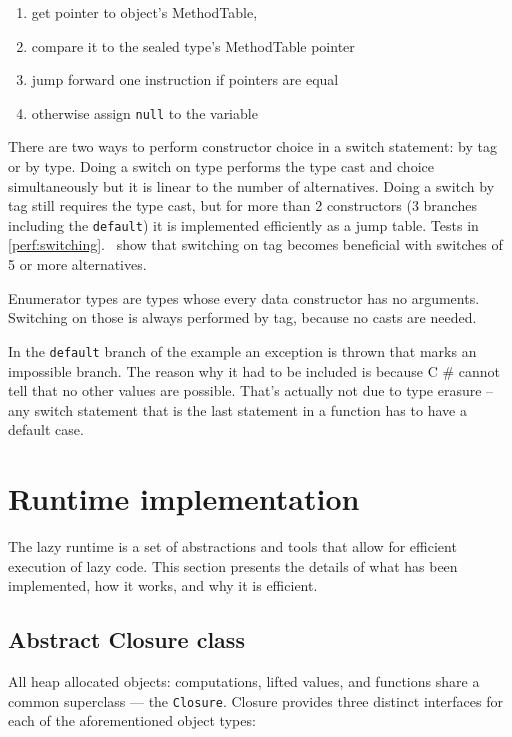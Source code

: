 \documentclass[en]{pracamgr}
\newcommand{\shrp}{%
  {\fontfamily{ppl}\selectfont\#%
  }}
\newcommand{\myref}[1]{\ref{#1}.~\textit{\nameref{#1}}}
\begin{document}
\begin{enumerate}
    \item get pointer to object's MethodTable,
    \item compare it to the sealed type's MethodTable pointer
    \item jump forward one instruction if pointers are equal
    \item otherwise assign \texttt{null} to the variable 
\end{enumerate}

There are two ways to perform constructor choice in a switch statement:
by tag or by type. Doing a switch on type performs the type
cast and choice simultaneously but it is linear to the
number of alternatives. Doing a switch by tag still
requires the type cast, but for more than 2 constructors (3
branches including the \texttt{default}) it is implemented efficiently as a jump table.
Tests in \myref{perf:switching} show that switching on tag
becomes beneficial with switches of 5 or more alternatives.

Enumerator types are types whose every data constructor has no arguments.
Switching on those is always performed by tag, because no casts are needed.

In the \texttt{default} branch of the example an exception is thrown that marks
an impossible branch.
The reason why it had to be included is because C\shrp{}
cannot tell that no other values are possible.
That's actually not due to type erasure -- any switch statement that
is the last statement in a function has to have a default case.

\section{Runtime implementation}\label{s:runtime_impl}

The lazy runtime is a set of abstractions and tools
that allow for efficient execution of lazy code.
This section presents the details of what has been implemented,
how it works, and why it is efficient.

\subsection{Abstract Closure class}

All heap allocated objects: computations, lifted values,
and functions share a common superclass –– the \texttt{Closure}.
Closure provides three distinct interfaces for each of the aforementioned object types:
\end{document}
